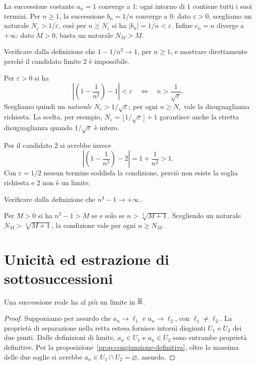 \begin{esempio}
La successione costante $a_n=1$ converge a $1$: ogni intorno di $1$ contiene tutti i suoi termini. Per $n\ge1$, la successione $b_n=1/n$ converge a $0$: dato $\varepsilon>0$, scegliamo un naturale $N_\varepsilon>1/\varepsilon$, così per $n\ge N_\varepsilon$ si ha $|b_n|=1/n<\varepsilon$. Infine $c_n=n$ diverge a $+\infty$: dato $M>0$, basta un naturale $N_M>M$.
\end{esempio}

\begin{esercizio}
Verificare dalla definizione che $1-1/n^2\to1$, per $n\ge1$, e mostrare direttamente perché il candidato limite $2$ è impossibile.
\end{esercizio}
\begin{svolgimento}
Per $\varepsilon>0$ si ha
\[
\left|\left(1-\frac1{n^2}\right)-1\right|<\varepsilon
\quad\Longleftrightarrow\quad n>\frac1{\sqrt\varepsilon}.
\]
Scegliamo quindi un \emph{naturale} $N_\varepsilon>1/\sqrt\varepsilon$; per ogni $n\ge N_\varepsilon$ vale la disuguaglianza richiesta. La scelta, per esempio, $N_\varepsilon=\lfloor1/\sqrt\varepsilon\rfloor+1$ garantisce anche la stretta disuguaglianza quando $1/\sqrt\varepsilon$ è intero.

Per il candidato $2$ si avrebbe invece
\[
\left|\left(1-\frac1{n^2}\right)-2\right|
=1+\frac1{n^2}>1.
\]
Con $\varepsilon=1/2$ nessun termine soddisfa la condizione, perciò non esiste la soglia richiesta e $2$ non è un limite.
\end{svolgimento}

\begin{esercizio}
Verificare dalla definizione che $n^3-1\to+\infty$.
\end{esercizio}
\begin{svolgimento}
Per $M>0$ si ha $n^3-1>M$ se e solo se $n>\sqrt[3]{M+1}$. Scegliendo un naturale $N_M>\sqrt[3]{M+1}$, la condizione vale per ogni $n\ge N_M$.
\end{svolgimento}

\section{Unicità ed estrazione di sottosuccessioni}

\begin{teorema}
Una successione reale ha al più un limite in $\overline{\mathbb{R}}$.
\end{teorema}
\begin{proof}
Supponiamo per assurdo che $a_n\to\ell_1$ e $a_n\to\ell_2$, con $\ell_1\ne\ell_2$. La proprietà di separazione nella retta estesa fornisce intorni disgiunti $U_1$ e $U_2$ dei due punti. Dalle definizioni di limite, $a_n\in U_1$ e $a_n\in U_2$ sono entrambe proprietà definitive. Per la proposizione~\ref{prop:congiunzione-definitiva}, oltre la massima delle due soglie si avrebbe $a_n\in U_1\cap U_2=\varnothing$, assurdo.
\end{proof}


